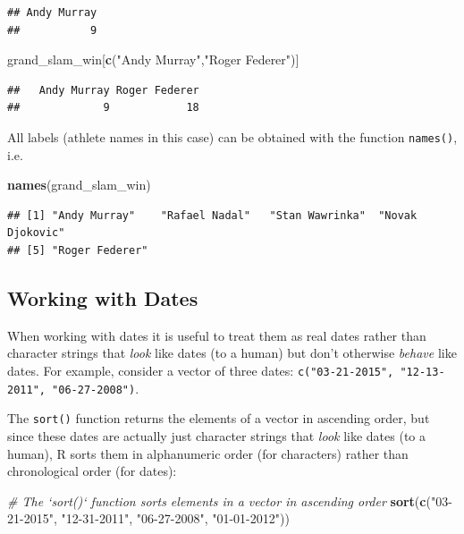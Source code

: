 \documentclass[12pt,]{krantz}
\newenvironment{Shaded}{\begin{snugshade}}{\end{snugshade}}
\newcommand{\KeywordTok}[1]{\textcolor[rgb]{0.27,0.27,0.27}{\textbf{#1}}}
\newcommand{\StringTok}[1]{\textcolor[rgb]{0.5,0.5,0.5}{#1}}
\newcommand{\CommentTok}[1]{\textcolor[rgb]{0.37,0.37,0.37}{\textit{#1}}}
\newcommand{\NormalTok}[1]{#1}
\begin{document}
\begin{verbatim}
## Andy Murray 
##           9
\end{verbatim}

\begin{Shaded}
\begin{Highlighting}[]
\NormalTok{grand_slam_win[}\KeywordTok{c}\NormalTok{(}\StringTok{"Andy Murray"}\NormalTok{,}\StringTok{"Roger Federer"}\NormalTok{)]}
\end{Highlighting}
\end{Shaded}

\begin{verbatim}
##   Andy Murray Roger Federer 
##             9            18
\end{verbatim}

All labels (athlete names in this case) can be obtained with the
function \texttt{names()}, i.e.

\begin{Shaded}
\begin{Highlighting}[]
\KeywordTok{names}\NormalTok{(grand_slam_win)}
\end{Highlighting}
\end{Shaded}

\begin{verbatim}
## [1] "Andy Murray"    "Rafael Nadal"   "Stan Wawrinka"  "Novak Djokovic"
## [5] "Roger Federer"
\end{verbatim}

\subsection{Working with Dates}\label{working-with-dates}

When working with dates it is useful to treat them as real dates rather
than character strings that \emph{look} like dates (to a human) but
don't otherwise \emph{behave} like dates. For example, consider a vector
of three dates: \texttt{c("03-21-2015",\ "12-13-2011",\ "06-27-2008")}.

The \texttt{sort()} function returns the elements of a vector in
ascending order, but since these dates are actually just character
strings that \emph{look} like dates (to a human), R sorts them in
alphanumeric order (for characters) rather than chronological order (for
dates):

\begin{Shaded}
\begin{Highlighting}[]
\CommentTok{# The `sort()` function sorts elements in a vector in ascending order}
\KeywordTok{sort}\NormalTok{(}\KeywordTok{c}\NormalTok{(}\StringTok{"03-21-2015"}\NormalTok{, }\StringTok{"12-31-2011"}\NormalTok{, }\StringTok{"06-27-2008"}\NormalTok{, }\StringTok{"01-01-2012"}\NormalTok{))}
\end{Highlighting}
\end{Shaded}
\end{document}
